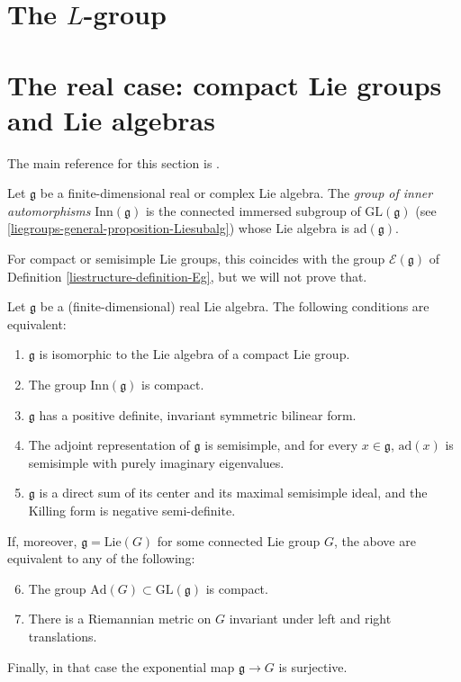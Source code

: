 \section{The $L$-group}
\label{section-L-group}

\section{The real case: compact Lie groups and Lie algebras}
\label{section-real-compact}

The main reference for this section is \cite[Ch.\ IX \S 1]{Bourbaki-Lie}.

\begin{definition}
 \label{definition-Inng}
Let $\mathfrak g$ be a finite-dimensional real or complex Lie algebra. The {\it group of inner automorphisms} $\text{Inn}(\mathfrak g)$ is the connected immersed subgroup of $\text{GL}(\mathfrak g)$ (see \ref{liegroups-general-proposition-Liesubalg}) whose Lie algebra is $\text{ad}(\mathfrak g)$.
\end{definition}

For compact or semisimple Lie groups, this coincides with the group $\mathcal E(\mathfrak g)$ of Definition \ref{liestructure-definition-Eg}, but we will not prove that.



\begin{proposition}
 \label{proposition-compact-Lie}
Let $\mathfrak g$ be a (finite-dimensional) real Lie algebra. The following conditions are equivalent:
\begin{enumerate}
 \item $\mathfrak g$ is isomorphic to the Lie algebra of a compact Lie group.
 \item The group $\text{Inn}(\mathfrak g)$ is compact.
 \item $\mathfrak g$ has a positive definite, invariant symmetric bilinear form.
 \item The adjoint representation of $\mathfrak g$ is semisimple, and for every $x\in \mathfrak g$, $\text{ad}(x)$ is semisimple with purely imaginary eigenvalues.
 \item $\mathfrak g$ is a direct sum of its center and its maximal semisimple ideal, and the Killing form is negative semi-definite. 
\end{enumerate}

If, moreover, $\mathfrak g = \text{Lie}(G)$ for some connected Lie group $G$, the above are equivalent to any of the following:
\begin{enumerate}\setcounter{enumi}{5}
 \item The group $\text{Ad}(G)\subset \text{GL}(\mathfrak g)$ is compact.
 \item There is a Riemannian metric on $G$ invariant under left and right translations.
\end{enumerate}

Finally, in that case the exponential map $\mathfrak g \to G$ is surjective.
\end{proposition}

